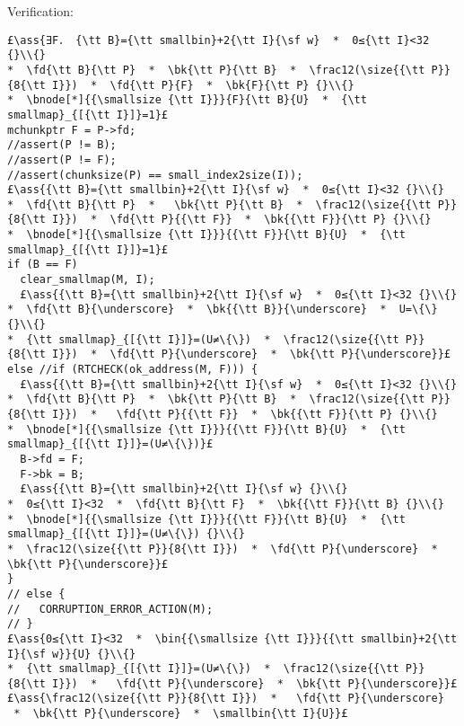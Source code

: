 \documentclass[10pt,a4paper,twoside]{report}
\makeatletter
\newcommand{\ml}[2][t]{\mbox{\mdseries\begin{tabular}[#1]{@{}L@{}}#2\end{tabular}}}
\newcommand{\ass}[1]{\ensuremath{{\color{blue}\left\{\ml[c]{#1}\right\}}}}
\makeatother
\begin{document}
\noindent Verification:
\begin{lstlisting}
£\ass{∃F． {\tt B}={\tt smallbin}+2{\tt I}{\sf w}  *  0≤{\tt I}<32 {}\\{}
*  \fd{\tt B}{\tt P}  *  \bk{\tt P}{\tt B}  *  \frac12(\size{{\tt P}}{8{\tt I}})  *  \fd{\tt P}{F}  *  \bk{F}{\tt P} {}\\{}
*  \bnode[*]{{\smallsize {\tt I}}}{F}{\tt B}{U}  *  {\tt smallmap}_{[{\tt I}]}=1}£
mchunkptr F = P->fd;
//assert(P != B);
//assert(P != F);
//assert(chunksize(P) == small_index2size(I));
£\ass{{\tt B}={\tt smallbin}+2{\tt I}{\sf w}  *  0≤{\tt I}<32 {}\\{}
*  \fd{\tt B}{\tt P}  *   \bk{\tt P}{\tt B}  *  \frac12(\size{{\tt P}}{8{\tt I}})  *  \fd{\tt P}{{\tt F}}  *  \bk{{\tt F}}{\tt P} {}\\{}
*  \bnode[*]{{\smallsize {\tt I}}}{{\tt F}}{\tt B}{U}  *  {\tt smallmap}_{[{\tt I}]}=1}£
if (B == F)
  clear_smallmap(M, I);
  £\ass{{\tt B}={\tt smallbin}+2{\tt I}{\sf w}  *  0≤{\tt I}<32 {}\\{}
*  \fd{\tt B}{\underscore}  *  \bk{{\tt B}}{\underscore}  *  U=\{\} {}\\{}
*  {\tt smallmap}_{[{\tt I}]}=(U≠\{\})  *  \frac12(\size{{\tt P}}{8{\tt I}})  *  \fd{\tt P}{\underscore}  *  \bk{\tt P}{\underscore}}£
else //if (RTCHECK(ok_address(M, F))) {
  £\ass{{\tt B}={\tt smallbin}+2{\tt I}{\sf w}  *  0≤{\tt I}<32 {}\\{}
*  \fd{\tt B}{\tt P}  *  \bk{\tt P}{\tt B}  *  \frac12(\size{{\tt P}}{8{\tt I}})  *   \fd{\tt P}{{\tt F}}  *  \bk{{\tt F}}{\tt P} {}\\{}
*  \bnode[*]{{\smallsize {\tt I}}}{{\tt F}}{\tt B}{U}  *  {\tt smallmap}_{[{\tt I}]}=(U≠\{\})}£
  B->fd = F;
  F->bk = B;
  £\ass{{\tt B}={\tt smallbin}+2{\tt I}{\sf w} {}\\{}
*  0≤{\tt I}<32  *  \fd{\tt B}{\tt F}  *  \bk{{\tt F}}{\tt B} {}\\{}
*  \bnode[*]{{\smallsize {\tt I}}}{{\tt F}}{\tt B}{U}  *  {\tt smallmap}_{[{\tt I}]}=(U≠\{\}) {}\\{} 
*  \frac12(\size{{\tt P}}{8{\tt I}})  *  \fd{\tt P}{\underscore}  *  \bk{\tt P}{\underscore}}£
}
// else {
//   CORRUPTION_ERROR_ACTION(M);
// }
£\ass{0≤{\tt I}<32  *  \bin{{\smallsize {\tt I}}}{{\tt smallbin}+2{\tt I}{\sf w}}{U} {}\\{}
*  {\tt smallmap}_{[{\tt I}]}=(U≠\{\})  *  \frac12(\size{{\tt P}}{8{\tt I}})  *   \fd{\tt P}{\underscore}  *  \bk{\tt P}{\underscore}}£
£\ass{\frac12(\size{{\tt P}}{8{\tt I}})  *   \fd{\tt P}{\underscore}  *  \bk{\tt P}{\underscore}  *  \smallbin{\tt I}{U}}£
\end{lstlisting}
\end{document}

